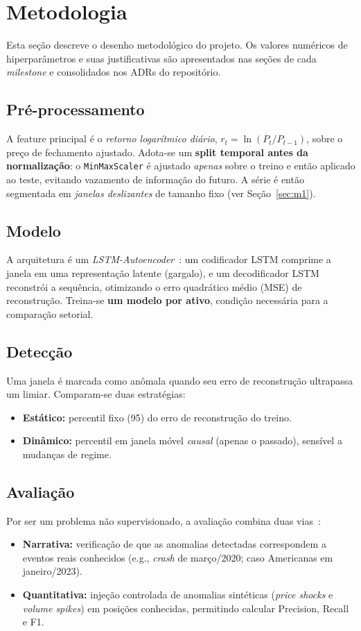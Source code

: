 \section{Metodologia}
\label{sec:metodologia}

Esta seção descreve o desenho metodológico do projeto. Os valores numéricos de
hiperparâmetros e suas justificativas são apresentados nas seções de cada
\emph{milestone} e consolidados nos ADRs do repositório.

\subsection{Pré-processamento}
A feature principal é o \emph{retorno logarítmico diário},
$r_t = \ln(P_t / P_{t-1})$, sobre o preço de fechamento ajustado. Adota-se um
\textbf{split temporal antes da normalização}: o \texttt{MinMaxScaler} é ajustado
\emph{apenas} sobre o treino e então aplicado ao teste, evitando vazamento de
informação do futuro. A série é então segmentada em \emph{janelas deslizantes} de
tamanho fixo (ver Seção~\ref{sec:m1}).

\subsection{Modelo}
A arquitetura é um \emph{LSTM-Autoencoder}~\cite{hochreiter1997lstm}: um codificador
LSTM comprime a janela em uma representação latente (gargalo), e um decodificador LSTM
reconstrói a sequência, otimizando o erro quadrático médio (MSE) de reconstrução. Treina-se
\textbf{um modelo por ativo}, condição necessária para a comparação setorial.

\subsection{Detecção}
Uma janela é marcada como anômala quando seu erro de reconstrução ultrapassa um limiar.
Comparam-se duas estratégias:
\begin{itemize}[noitemsep]
  \item \textbf{Estático:} percentil fixo (95) do erro de reconstrução do treino.
  \item \textbf{Dinâmico:} percentil em janela móvel \emph{causal} (apenas o passado),
        sensível a mudanças de regime.
\end{itemize}

\subsection{Avaliação}
Por ser um problema não supervisionado, a avaliação combina duas vias~\cite{liu2025robust}:
\begin{itemize}[noitemsep]
  \item \textbf{Narrativa:} verificação de que as anomalias detectadas correspondem a
        eventos reais conhecidos (e.g., \emph{crash} de março/2020; caso Americanas em
        janeiro/2023).
  \item \textbf{Quantitativa:} injeção controlada de anomalias sintéticas (\emph{price
        shocks} e \emph{volume spikes}) em posições conhecidas, permitindo calcular
        Precision, Recall e F1.
\end{itemize}

